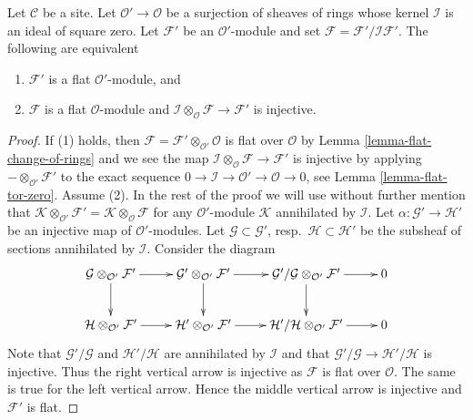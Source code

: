 \begin{lemma}
\label{lemma-flat-over-thickening}
Let $\mathcal{C}$ be a site. Let $\mathcal{O}' \to \mathcal{O}$
be a surjection of sheaves of rings whose kernel $\mathcal{I}$ is
an ideal of square zero. Let $\mathcal{F}'$ be an $\mathcal{O}'$-module
and set $\mathcal{F} = \mathcal{F}'/\mathcal{I}\mathcal{F}'$.
The following are equivalent
\begin{enumerate}
\item $\mathcal{F}'$ is a flat $\mathcal{O}'$-module, and
\item $\mathcal{F}$ is a flat $\mathcal{O}$-module and
$\mathcal{I} \otimes_\mathcal{O} \mathcal{F} \to \mathcal{F}'$
is injective.
\end{enumerate}
\end{lemma}

\begin{proof}
If (1) holds, then
$\mathcal{F} = \mathcal{F}' \otimes_{\mathcal{O}'} \mathcal{O}$ is
flat over $\mathcal{O}$ by
Lemma \ref{lemma-flat-change-of-rings}
and we see the map
$\mathcal{I} \otimes_\mathcal{O} \mathcal{F} \to \mathcal{F}'$
is injective by applying $- \otimes_{\mathcal{O}'} \mathcal{F}'$
to the exact sequence
$0 \to \mathcal{I} \to \mathcal{O}' \to \mathcal{O} \to 0$, see
Lemma \ref{lemma-flat-tor-zero}.
Assume (2). In the rest of the proof we will use without further mention
that $\mathcal{K} \otimes_{\mathcal{O}'} \mathcal{F}' =
\mathcal{K} \otimes_\mathcal{O} \mathcal{F}$
for any $\mathcal{O}'$-module $\mathcal{K}$ annihilated by $\mathcal{I}$.
Let $\alpha : \mathcal{G}' \to \mathcal{H}'$
be an injective map of $\mathcal{O}'$-modules. Let
$\mathcal{G} \subset \mathcal{G}'$, resp.\ $\mathcal{H} \subset \mathcal{H}'$
be the subsheaf of sections annihilated by $\mathcal{I}$.
Consider the diagram
$$
\xymatrix{
\mathcal{G} \otimes_{\mathcal{O}'} \mathcal{F}' \ar[r] \ar[d] &
\mathcal{G}' \otimes_{\mathcal{O}'} \mathcal{F}' \ar[r] \ar[d] &
\mathcal{G}'/\mathcal{G} \otimes_{\mathcal{O}'} \mathcal{F}' \ar[r] \ar[d] &
0 \\
\mathcal{H} \otimes_{\mathcal{O}'} \mathcal{F}' \ar[r] &
\mathcal{H}' \otimes_{\mathcal{O}'} \mathcal{F}' \ar[r] &
\mathcal{H}'/\mathcal{H} \otimes_{\mathcal{O}'} \mathcal{F}' \ar[r] & 0
}
$$
Note that $\mathcal{G}'/\mathcal{G}$ and $\mathcal{H}'/\mathcal{H}$
are annihilated by $\mathcal{I}$ and that
$\mathcal{G}'/\mathcal{G} \to \mathcal{H}'/\mathcal{H}$ is injective.
Thus the right vertical arrow is injective as $\mathcal{F}$ is flat
over $\mathcal{O}$. The same is true for the left vertical arrow.
Hence the middle vertical arrow is injective and $\mathcal{F}'$ is flat.
\end{proof}

